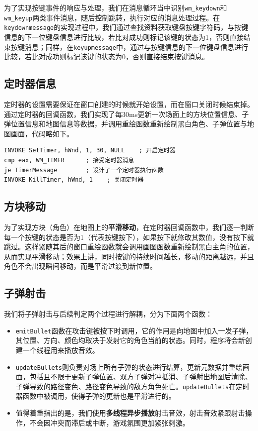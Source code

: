 \documentclass[lang=cn,11pt,a4paper]{elegantpaper}
\begin{document}
为了实现按键事件的响应与处理，我们在消息循环当中识别\verb|wm_keydown|和\verb|wm_keyup|两类事件消息，随后控制跳转，执行对应的消息处理过程。在\verb|keydownmessage|的实现过程中，我们通过查找资料获取键盘按键字符码，与按键信息的下一位键盘信息进行比较，若比对成功则标记该键的状态为1，否则直接结束按键消息；同样，在\verb|keyupmessage|中，通过与按键信息的下一位键盘信息进行比较，若比对成功则标记该键的状态为0，否则直接结束按键消息。

\subsection{定时器信息}

定时器的设置需要保证在窗口创建的时候就开始设置，而在窗口关闭时候结束掉。通过定时器的回调函数，我们实现了每30ms更新一次场面上的方块位置信息、子弹位置信息和地图信息等数据，并调用重绘函数重新绘制黑白角色、子弹位置与地图画面，代码略如下。

\begin{lstlisting}[title=代码1：定时器]
INVOKE SetTimer, hWnd, 1, 30, NULL    ; 开启定时器
cmp eax, WM_TIMER      ; 接受定时器消息
je TimerMessage        ; 设计了一个定时器执行函数
INVOKE KillTimer, hWnd, 1    ; 关闭定时器
\end{lstlisting}

\subsection{方块移动}

为了实现方块（角色）在地图上的\textbf{平滑移动}，在定时器回调函数中，我们逐一判断每一个按键的状态是否为1（代表按键按下），如果按下就修改其数值，没有按下就跳过。这样紧随其后的窗口重绘函数就会调用画图函数重新绘制黑白主角的位置，从而实现平滑移动；效果上讲，同时按键的持续时间越长，移动的距离越远，并且角色不会出现瞬间移动，而是平滑过渡到新位置。

\subsection{子弹射击}

我们将子弹射击与后续判定两个过程进行解耦，分为下面两个函数：

\begin{itemize}
    \item \verb|emitBullet|函数在攻击键被按下时调用，它的作用是向地图中加入一发子弹，其位置、方向、颜色均取决于发射它的角色当前的状态。同时，程序将会新创建一个线程用来播放音效。
    \item \verb|updateBullets|则负责对场上所有子弹的状态进行结算，更新元数据并重绘画面，包括且不限于更新子弹位置、双方子弹对冲抵消、子弹射出地图后清除、子弹导致的路径变色、路径变色导致的敌方角色死亡。\verb|updateBullets|在定时器函数中被调用，使得子弹的更新也是平滑进行的。
    \item 值得着重指出的是，我们使用\textbf{多线程异步播放}射击音效，射击音效紧跟射击操作，不会因冲突而滞后或中断，游戏氛围更加紧张刺激。
\end{itemize}
\end{document}
